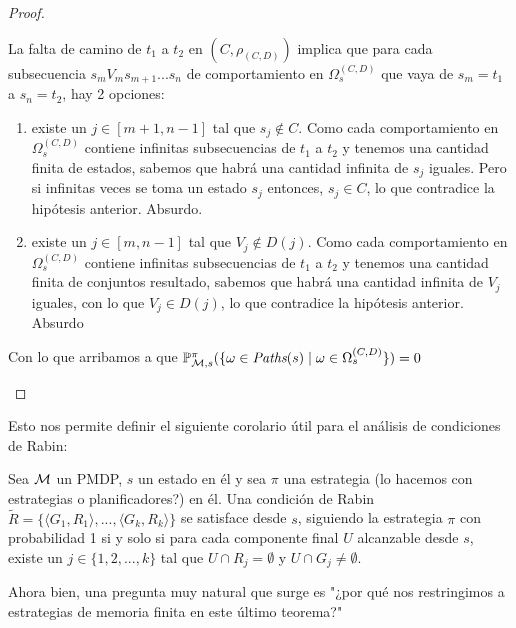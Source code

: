 \begin{proof}
\begin{itemize}
		      La falta de camino de $t_1$ a $t_2$ en $(C, \rho_{(C,D)})$ implica que para
		      cada subsecuencia $s_m V_m s_{m+1} ... s_n$ de comportamiento en
		      $\Omega_s^{(C,D)}$ que vaya de $s_m=t_1$ a $s_n=t_2$, hay 2 opciones:

		      \begin{enumerate}
			      \item existe un $j \in [m+1, n-1]$ tal que $s_j \notin C$. Como cada comportamiento
			            en $\Omega_s^{(C,D)}$ contiene infinitas subsecuencias de $t_1$ a $t_2$ y
			            tenemos una cantidad finita de estados, sabemos que habrá una cantidad infinita
			            de $s_j$ iguales. Pero si infinitas veces se toma un estado $s_j$ entonces,
			            $s_j \in C$, lo que contradice la hipótesis anterior. Absurdo.

			      \item existe un $j \in [m, n-1]$ tal que $V_j \notin D(j)$. Como cada comportamiento
			            en $\Omega_s^{(C,D)}$ contiene infinitas subsecuencias de $t_1$ a $t_2$ y
			            tenemos una cantidad finita de conjuntos resultado, sabemos que habrá una
			            cantidad infinita de $V_j$ iguales, con lo que $V_j \in D(j)$, lo que
			            contradice la hipótesis anterior. Absurdo
		      \end{enumerate}
		      Con lo que arribamos a que $\mathbb{P}^\pi_{\mathcal{M}, s}(\{ \omega \in \textit{Paths}(s) \mid \omega \in \Omega_s^{(C,D)}\}) = 0  $
	\end{itemize}

\end{proof}

Esto nos permite definir el siguiente corolario útil para el análisis de
condiciones de Rabin:

\begin{corollary}
	\label{adaptB30}
	Sea $\mathcal{M}$ un PMDP, $s$ un estado en él y sea $\pi$ una estrategia (lo hacemos con estrategias o planificadores?) en él. Una condición de Rabin $\widetilde{R} = \{ \langle G_1, R_1 \rangle, ...,  \langle G_k, R_k \rangle \}$ se satisface desde $s$, siguiendo la estrategia $\pi$ con probabilidad 1 si y solo si para cada componente final $U$ alcanzable desde $s$, existe un $j \in \{ 1, 2, ..., k\}$ tal que $U \cap R_j = \emptyset$ y $U \cap G_j \neq \emptyset$.
\end{corollary}

Ahora bien, una pregunta muy natural que surge es "¿por qué nos restringimos a
estrategias de memoria finita en este último teorema?"

